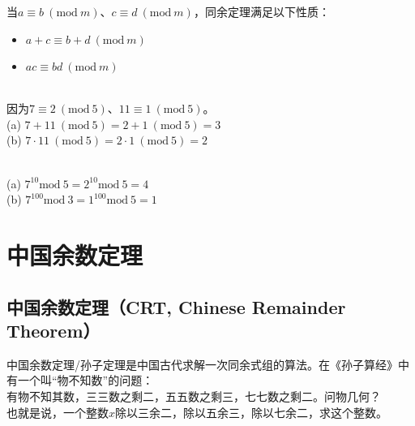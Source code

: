 \vspace{0.5cm}

当$ a \equiv b\ (\text{mod}\ m) $、$ c \equiv d\ (\text{mod}\ m) $，同余定理满足以下性质：

\begin{itemize}
    \item $ a + c \equiv b + d\ (\text{mod}\ m) $
    \item $ ac \equiv bd\ (\text{mod}\ m) $
\end{itemize}

\vspace{0.5cm}

\begin{tcolorbox}
    \\
    因为$ 7 \equiv 2\ (\text{mod}\ 5) $、$ 11 \equiv 1\ (\text{mod}\ 5) $。\\
    (a) $ 7 + 11\ (\text{mod}\ 5) = 2 + 1 \ (\text{mod}\ 5) = 3 $\\
    (b) $ 7 \cdot 11\ (\text{mod}\ 5) = 2 \cdot 1 \ (\text{mod}\ 5) = 2 $
\end{tcolorbox}

\vspace{0.5cm}

\begin{tcolorbox}
    \\
    (a) $ 7^{10} \text{mod}\ 5 = 2^{10} \text{mod}\ 5 = 4 $\\
    (b) $ 7^{100} \text{mod}\ 3 = 1^{100} \text{mod}\ 5 = 1 $
\end{tcolorbox}

\newpage

\section{中国余数定理}

\subsection{中国余数定理（CRT, Chinese Remainder Theorem）}

中国余数定理/孙子定理是中国古代求解一次同余式组的算法。在《孙子算经》中有一个叫“物不知数”的问题：\\

有物不知其数，三三数之剩二，五五数之剩三，七七数之剩二。问物几何？\\

也就是说，一个整数$ x $除以三余二，除以五余三，除以七余二，求这个整数。\\

